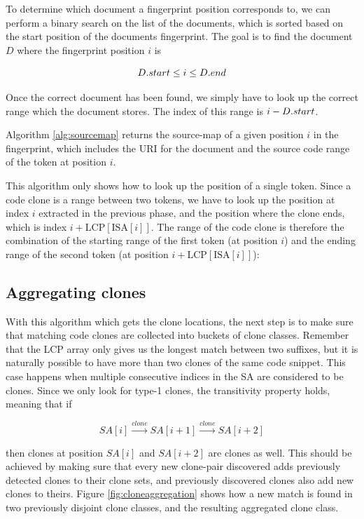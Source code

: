 To determine which document a fingerprint position corresponds to, we can perform a binary
search on the list of the documents, which is sorted based on the start position of the
documents fingerprint. The goal is to find the document $D$ where the fingerprint position $i$
is 

$$
{{D}.{start}} \leq i \leq {{D}.{end}}
$$

Once the correct document has been found, we simply have to look up the correct range
which the document stores. The index of this range is $i -
{{D}.{start}}$.

Algorithm \ref{alg:sourcemap} returns the source-map of a given position $i$ in the
fingerprint, which includes the URI for the document and the source code range of the
token at position $i$.

This algorithm only shows how to look up the position of a single token. Since a code
clone is a range between two tokens, we have to look up the position at index $i$
extracted in the previous phase, and the position where the clone ends, which is index $i
+ \text{LCP}[\text{ISA}[i]]$. The range of the code clone is therefore the combination of
the starting range of the first token (at position $i$) and the ending range of the second
token (at position $i + \text{LCP}[\text{ISA}[i]]$):

\subsection*{Aggregating clones}

With this algorithm which gets the clone locations, the next step is to make sure that
matching code clones are collected into buckets of clone classes. Remember that the LCP
array only gives us the longest match between two suffixes, but it is naturally possible
to have more than two clones of the same code snippet. This case happens when multiple
consecutive indices in the SA are considered to be clones. Since we only look for type-1
clones, the transitivity property holds, meaning that if

$$
SA[i] \xrightarrow{clone} SA[i+1] \xrightarrow{clone} SA[i + 2]
$$

then clones at position $SA[i]$ and $SA[i + 2]$ are clones as well. This should be
achieved by making sure that every new clone-pair discovered adds previously detected
clones to their clone sets, and previously discovered clones also add new clones to
theirs. Figure \ref{fig:cloneaggregation} shows how a new match is found in two previously
disjoint clone classes, and the resulting aggregated clone class.

